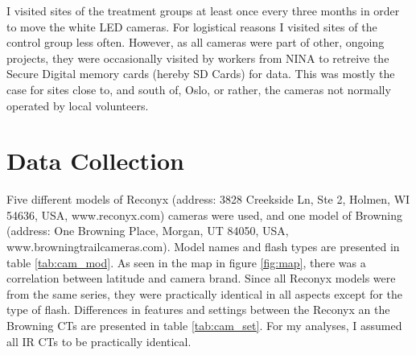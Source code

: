 I visited sites of the treatment groups at least once every three months in order to move the white LED cameras.
For logistical reasons I visited sites of the control group less often.
However, as all cameras were part of other, ongoing projects, they were occasionally visited by workers from NINA to retreive the Secure Digital memory cards (hereby SD Cards) for data. %
This was mostly the case for sites close to, and south of, Oslo, or rather, the cameras not normally operated by local volunteers.








\section{Data Collection} 


Five different models of Reconyx (address: 3828 Creekside Ln, Ste 2, Holmen, WI 54636, USA, www.reconyx.com) cameras were used, 
and one model of Browning (address: One Browning Place, Morgan, UT 84050, USA, www.browningtrailcameras.com).
Model names and flash types are presented in table \ref{tab:cam_mod}.  
As seen in the map in figure \ref{fig:map}, there was a correlation between latitude and camera brand.
Since all Reconyx models were from the same series, they were practically identical in all aspects except for the type of flash. Differences in features and settings between the Reconyx an the Browning CTs are presented in table \ref{tab:cam_set}. For my analyses, I assumed all IR CTs to be practically identical.


